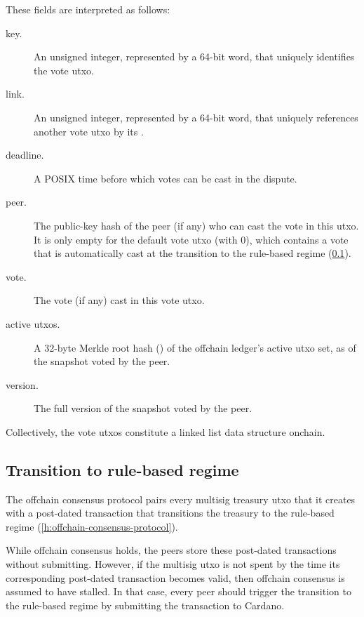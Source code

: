\documentclass[../hydrozoa.tex]{subfiles}
\begin{document}
These fields are interpreted as follows:
\begin{description}
  \item[key.] An unsigned integer, represented by a 64-bit word, that uniquely identifies the vote utxo.
  \item[link.] An unsigned integer, represented by a 64-bit word, that uniquely references another vote utxo by its .
  \item[deadline.] A POSIX time before which votes can be cast in the dispute.
  \item[peer.] The public-key hash of the peer (if any) who can cast the vote in this utxo. It is only empty for the default vote utxo (with  0), which contains a vote that is automatically cast at the transition to the rule-based regime (\cref{h:rule-based-transition}).
  \item[vote.] The vote (if any) cast in this vote utxo.
  \item[active utxos.] A 32-byte Merkle root hash () of the offchain ledger's active utxo set, as of the snapshot voted by the peer.
  \item[version.] The full version of the snapshot voted by the peer.
\end{description}

Collectively, the vote utxos constitute a linked list data structure onchain.

\subsection{Transition to rule-based regime}%
\label{h:rule-based-transition}

The offchain consensus protocol pairs every multisig treasury utxo that it creates with a post-dated transaction that transitions the treasury to the rule-based regime (\cref{h:offchain-consensus-protocol}).

While offchain consensus holds, the peers store these post-dated transactions without submitting.
However, if the multisig utxo is not spent by the time its corresponding post-dated transaction becomes valid, then offchain consensus is assumed to have stalled.
In that case, every peer should trigger the transition to the rule-based regime by submitting the transaction to Cardano.
\end{document}
